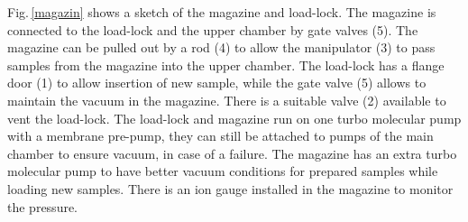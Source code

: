 \documentclass[a4paper,12pt,twoside]{article}
\begin{document}
\noindent Fig.\,\ref{magazin} shows a sketch of the magazine and load-lock. The magazine is connected to the load-lock and the upper chamber by gate valves (5). The magazine can be pulled out by a rod (4) to allow the manipulator (3) to pass samples from the magazine into the upper chamber. The load-lock has a flange door (1) to allow insertion of new sample, while the gate valve (5) allows to maintain the vacuum in the magazine. There is a suitable valve (2) available to vent the load-lock. The load-lock and magazine run on one turbo molecular pump with a membrane pre-pump, they can still be attached to pumps of the main chamber to ensure vacuum, in case of a failure. The magazine has an extra turbo molecular pump to have better vacuum conditions for prepared samples while loading new samples. There is an ion gauge installed in the magazine to monitor the pressure.
\end{document}
